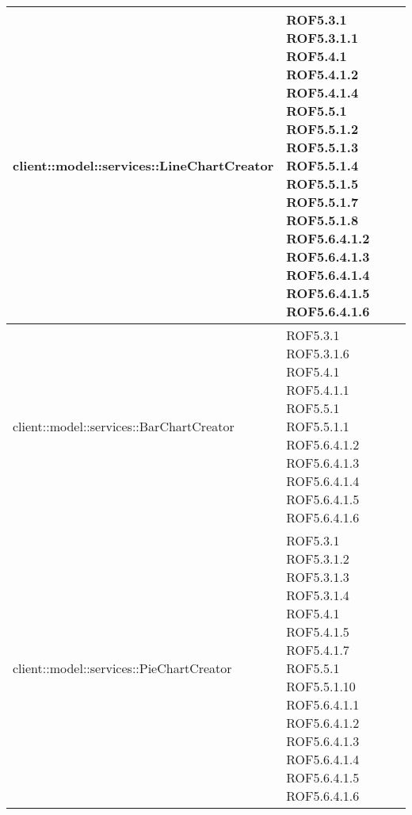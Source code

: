 \begin{center}
\begin{longtable}{| p{11cm} | p{2.5cm} |}
\hline
client::model::services::LineChartCreator & ROF5.3.1 \newline ROF5.3.1.1 \newline ROF5.4.1 \newline ROF5.4.1.2 \newline ROF5.4.1.4 \newline ROF5.5.1 \newline ROF5.5.1.2 \newline ROF5.5.1.3 \newline ROF5.5.1.4 \newline ROF5.5.1.5 \newline ROF5.5.1.7 \newline ROF5.5.1.8 \newline ROF5.6.4.1.2 \newline ROF5.6.4.1.3 \newline ROF5.6.4.1.4 \newline ROF5.6.4.1.5 \newline ROF5.6.4.1.6 \\
\hline
client::model::services::BarChartCreator & ROF5.3.1 \newline ROF5.3.1.6 \newline ROF5.4.1 \newline ROF5.4.1.1 \newline ROF5.5.1 \newline ROF5.5.1.1 \newline ROF5.6.4.1.2 \newline ROF5.6.4.1.3 \newline ROF5.6.4.1.4 \newline ROF5.6.4.1.5 \newline ROF5.6.4.1.6 \\
\hline
client::model::services::PieChartCreator & ROF5.3.1 \newline ROF5.3.1.2 \newline ROF5.3.1.3 \newline ROF5.3.1.4 \newline ROF5.4.1 \newline ROF5.4.1.5 \newline ROF5.4.1.7 \newline ROF5.5.1 \newline ROF5.5.1.10 \newline ROF5.6.4.1.1 \newline ROF5.6.4.1.2 \newline ROF5.6.4.1.3 \newline ROF5.6.4.1.4 \newline ROF5.6.4.1.5 \newline ROF5.6.4.1.6 \\

\end{longtable}
\end{center}
